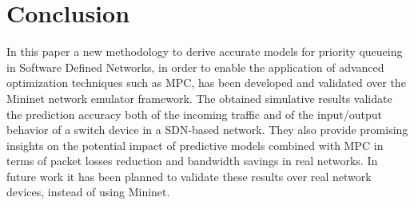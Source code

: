 \chapter*{Conclusion} 
In this paper a new methodology to derive accurate models for priority queueing in Software Defined Networks, in order to enable the application of advanced optimization techniques such as MPC, has been developed and validated over the Mininet network emulator framework. The obtained simulative results validate the prediction accuracy both of the incoming traffic and of the input/output behavior of a switch device in a SDN-based network. They also provide promising insights on the potential impact of predictive models combined with MPC in terms of packet losses reduction and bandwidth savings in real networks. In future work it has been planned to validate these results over real network devices, instead of using Mininet.

